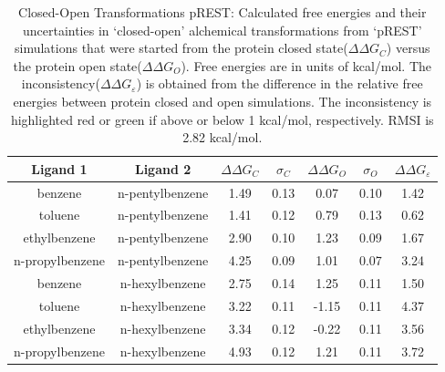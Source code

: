 \begin{table}[!htb]
\centering
\caption{Closed-Open Transformations pREST:
Calculated free energies and their uncertainties in `closed-open' alchemical transformations from `pREST' simulations that were started from the protein closed state(\boldmath$\Delta\Delta G_{C}$) versus the protein open state(\boldmath$\Delta\Delta G_{O}$).
Free energies are in units of kcal/mol. 
The inconsistency(\boldmath$\Delta\Delta G_{\varepsilon}$) is obtained from the difference in the relative free energies between protein closed and open simulations. 
The inconsistency is highlighted red or green if above or below 1 kcal/mol, respectively.
RMSI is 2.82 kcal/mol. 
}
\label{tbl:C-O_pREST}
\begin{tabular}{|c|c|c|c|c|c|c|}
\hline
\textbf{Ligand 1}       & \textbf{Ligand 2}    & \boldmath$\Delta\Delta G_{C}$ & \boldmath$\sigma_{C}$ & \boldmath$\Delta\Delta G_{O}$ & \boldmath$\sigma_{O}$ & \boldmath$\Delta\Delta G_{\varepsilon}$\\ \hline
benzene         & n-pentylbenzene & 1.49       & 0.13     & 0.07   & 0.10     & \cellcolor[HTML]{FFCCC9}1.42 \\ \hline
toluene         & n-pentylbenzene & 1.41       & 0.12     & 0.79   & 0.13     & \cellcolor[HTML]{9AFF99}0.62 \\ \hline
ethylbenzene    & n-pentylbenzene & 2.90       & 0.10     & 1.23   & 0.09     & \cellcolor[HTML]{FFCCC9}1.67 \\ \hline
n-propylbenzene & n-pentylbenzene & 4.25       & 0.09     & 1.01   & 0.07     & \cellcolor[HTML]{FFCCC9}3.24 \\ \hline
benzene         & n-hexylbenzene  & 2.75       & 0.14     & 1.25   & 0.11     & \cellcolor[HTML]{FFCCC9}1.50 \\ \hline
toluene         & n-hexylbenzene  & 3.22       & 0.11     & -1.15  & 0.11     & \cellcolor[HTML]{FFCCC9}4.37 \\ \hline
ethylbenzene    & n-hexylbenzene  & 3.34       & 0.12     & -0.22  & 0.11     & \cellcolor[HTML]{FFCCC9}3.56 \\ \hline
n-propylbenzene & n-hexylbenzene  & 4.93       & 0.12     & 1.21   & 0.11     & \cellcolor[HTML]{FFCCC9}3.72 \\ \hline
\end{tabular}
\end{table}


